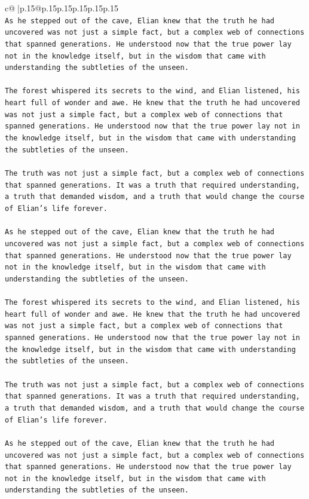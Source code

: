 \documentclass{article}
\begin{document}
{\begin{supertabular}{c@{$\;$}|p{.15\linewidth}@{}p{.15\linewidth}p{.15\linewidth}p{.15\linewidth}p{.15\linewidth}p{.15\linewidth}}
{{{\\ 
\texttt{As he stepped out of the cave, Elian knew that the truth he had uncovered was not just a simple fact, but a complex web of connections that spanned generations. He understood now that the true power lay not in the knowledge itself, but in the wisdom that came with understanding the subtleties of the unseen.} \\
\\ 
\texttt{The forest whispered its secrets to the wind, and Elian listened, his heart full of wonder and awe. He knew that the truth he had uncovered was not just a simple fact, but a complex web of connections that spanned generations. He understood now that the true power lay not in the knowledge itself, but in the wisdom that came with understanding the subtleties of the unseen.} \\
\\ 
\texttt{The truth was not just a simple fact, but a complex web of connections that spanned generations. It was a truth that required understanding, a truth that demanded wisdom, and a truth that would change the course of Elian's life forever.} \\
\\ 
\texttt{As he stepped out of the cave, Elian knew that the truth he had uncovered was not just a simple fact, but a complex web of connections that spanned generations. He understood now that the true power lay not in the knowledge itself, but in the wisdom that came with understanding the subtleties of the unseen.} \\
\\ 
\texttt{The forest whispered its secrets to the wind, and Elian listened, his heart full of wonder and awe. He knew that the truth he had uncovered was not just a simple fact, but a complex web of connections that spanned generations. He understood now that the true power lay not in the knowledge itself, but in the wisdom that came with understanding the subtleties of the unseen.} \\
\\ 
\texttt{The truth was not just a simple fact, but a complex web of connections that spanned generations. It was a truth that required understanding, a truth that demanded wisdom, and a truth that would change the course of Elian's life forever.} \\
\\ 
\texttt{As he stepped out of the cave, Elian knew that the truth he had uncovered was not just a simple fact, but a complex web of connections that spanned generations. He understood now that the true power lay not in the knowledge itself, but in the wisdom that came with understanding the subtleties of the unseen.} \\
}}}
\end{supertabular}}
\end{document}
